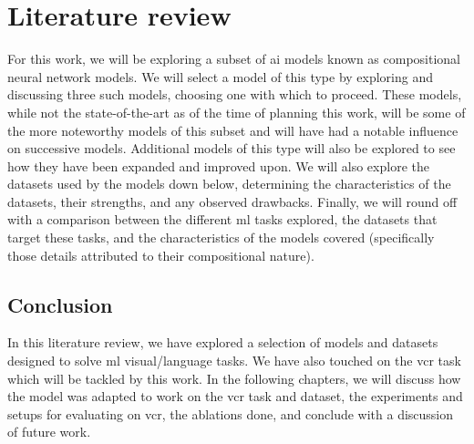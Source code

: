 \chapter{Literature review}
\label{chp:literature_review}

For this work, we will be exploring a subset of \gls{ai} models known as compositional neural network models.
We will select a model of this type by exploring and discussing three such models, choosing one with which to proceed.
These models, while not the state-of-the-art as of the time of planning this work, will be some of the more noteworthy models of this subset and will have had a notable influence on successive models.
Additional models of this type will also be explored to see how they have been expanded and improved upon.
We will also explore the datasets used by the models down below, determining the characteristics of the datasets, their strengths, and any observed drawbacks.
Finally, we will round off with a comparison between the different \gls{ml} tasks explored, the datasets that target these tasks, and the characteristics of the models covered (specifically those details attributed to their compositional nature).


\clearpage


\clearpage


\clearpage


\clearpage

\section{Conclusion}
\label{sec:literature_review_conclusion}

In this literature review, we have explored a selection of models and datasets designed to solve \gls{ml} visual/language tasks.
We have also touched on the \gls{vcr} task which will be tackled by this work.
In the following chapters, we will discuss how the model was adapted to work on the \gls{vcr} task and dataset, the experiments and setups for evaluating on \gls{vcr}, the ablations done, and conclude with a discussion of future work.
